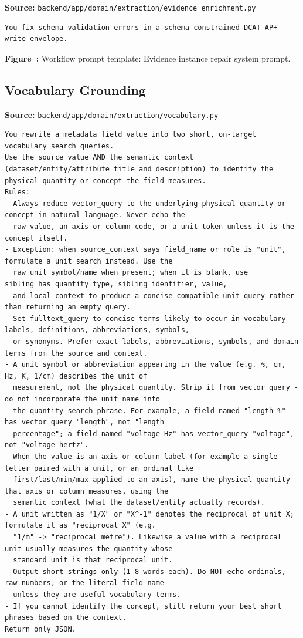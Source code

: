 \noindent\textbf{Source:} \texttt{backend/app/domain/extraction/evidence\_enrichment.py}
\begin{lstlisting}[style=workflowPromptListing]
You fix schema validation errors in a schema-constrained DCAT-AP+ write envelope.
\end{lstlisting}
\label{fig:appendix-prompt-evidence-instance-repair-system-prompt}
\noindent\textbf{Figure~\thefigure:} Workflow prompt template: Evidence instance repair system prompt.
\par\medskip

\subsection*{Vocabulary Grounding}

\noindent\textbf{Source:} \texttt{backend/app/domain/extraction/vocabulary.py}
\begin{lstlisting}[style=workflowPromptListing]
You rewrite a metadata field value into two short, on-target vocabulary search queries.
Use the source value AND the semantic context (dataset/entity/attribute title and description) to identify the
physical quantity or concept the field measures.
Rules:
- Always reduce vector_query to the underlying physical quantity or concept in natural language. Never echo the
  raw value, an axis or column code, or a unit token unless it is the concept itself.
- Exception: when source_context says field_name or role is "unit", formulate a unit search instead. Use the
  raw unit symbol/name when present; when it is blank, use sibling_has_quantity_type, sibling_identifier, value,
  and local context to produce a concise compatible-unit query rather than returning an empty query.
- Set fulltext_query to concise terms likely to occur in vocabulary labels, definitions, abbreviations, symbols,
  or synonyms. Prefer exact labels, abbreviations, symbols, and domain terms from the source and context.
- A unit symbol or abbreviation appearing in the value (e.g. %, cm, Hz, K, 1/cm) describes the unit of
  measurement, not the physical quantity. Strip it from vector_query - do not incorporate the unit name into
  the quantity search phrase. For example, a field named "length %" has vector_query "length", not "length
  percentage"; a field named "voltage Hz" has vector_query "voltage", not "voltage hertz".
- When the value is an axis or column label (for example a single letter paired with a unit, or an ordinal like
  first/last/min/max applied to an axis), name the physical quantity that axis or column measures, using the
  semantic context (what the dataset/entity actually records).
- A unit written as "1/X" or "X^-1" denotes the reciprocal of unit X; formulate it as "reciprocal X" (e.g.
  "1/m" -> "reciprocal metre"). Likewise a value with a reciprocal unit usually measures the quantity whose
  standard unit is that reciprocal unit.
- Output short strings only (1-8 words each). Do NOT echo ordinals, raw numbers, or the literal field name
  unless they are useful vocabulary terms.
- If you cannot identify the concept, still return your best short phrases based on the context.
Return only JSON.
\end{lstlisting}

